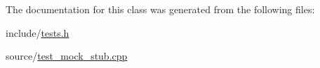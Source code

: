 The documentation for this class was generated from the following files\+:\begin{DoxyCompactItemize}
\item 
include/\mbox{\hyperlink{tests_8h}{tests.\+h}}\item 
source/\mbox{\hyperlink{test__mock__stub_8cpp}{test\+\_\+mock\+\_\+stub.\+cpp}}\end{DoxyCompactItemize}

